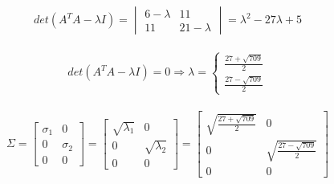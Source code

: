 \documentclass[a4paper, spanish]{article}
\begin{document}
  \begin{align}
    det(A^T A - \lambda I)
    = \begin{vmatrix}
      6 - \lambda & 11 \\
      11 & 21 - \lambda
    \end{vmatrix}
    = \lambda ^ 2 - 27 \lambda + 5
  \end{align}


  \begin{align}
    det(A^T A - \lambda I) = 0
    \Rightarrow
    \lambda =
    \begin{cases}
    \frac{27 + \sqrt{709}}{2} \\
    \frac{27 - \sqrt{709}}{2}
    \end{cases}
  \end{align}



  \begin{align}
    \Sigma =
    \begin{bmatrix}
      \sigma_1 & 0 \\
      0 & \sigma_2 \\
      0 & 0
    \end{bmatrix}
    =
    \begin{bmatrix}
      \sqrt{\lambda_1} & 0 \\
      0 & \sqrt{\lambda_2} \\
      0 & 0
    \end{bmatrix} =
    \begin{bmatrix}
      \sqrt{\frac{27 + \sqrt{709}}{2}} & 0 \\
      0 & \sqrt{\frac{27 - \sqrt{709}}{2}} \\
      0 & 0
    \end{bmatrix}
  \end{align}
\end{document}
